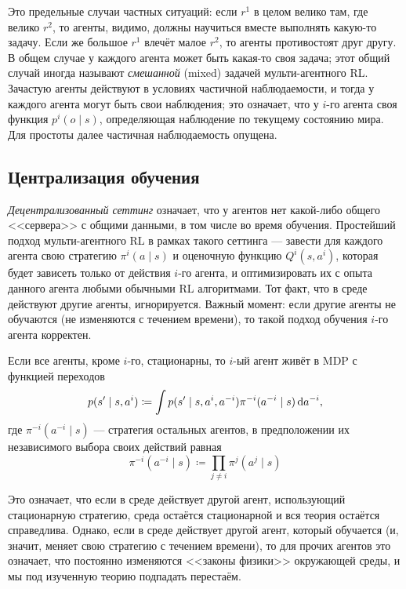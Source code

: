 Это предельные случаи частных ситуаций: если $r^1$ в целом велико там, где велико $r^2$, то агенты, видимо, должны научиться вместе выполнять какую-то задачу. Если же большое $r^1$ влечёт малое $r^2$, то агенты противостоят друг другу. В общем случае у каждого агента может быть какая-то своя задача; этот общий случай иногда называют \emph{смешанной} (mixed) задачей мульти-агентного RL. Зачастую агенты действуют в условиях частичной наблюдаемости, и тогда у каждого агента могут быть свои наблюдения; это означает, что у $i$-го агента своя функция $p^i(o \mid s)$, определяющая наблюдение по текущему состоянию мира. Для простоты далее частичная наблюдаемость опущена. 

\subsection{Централизация обучения}

\emph{Децентрализованный сеттинг} означает, что у агентов нет какой-либо общего <<сервера>> с общими данными, в том числе во время обучения. Простейший подход мульти-агентного RL в рамках такого сеттинга --- завести для каждого агента свою стратегию $\pi^i(a \mid s)$ и оценочную функцию $Q^i(s, a^i)$, которая будет зависеть только от действия $i$-го агента, и оптимизировать их с опыта данного агента любыми обычными RL алгоритмами. Тот факт, что в среде действуют другие агенты, игнорируется. Важный момент: если другие агенты не обучаются (не изменяются с течением времени), то такой подход обучения $i$-го агента корректен.

\begin{proposition}
Если все агенты, кроме $i$-го, стационарны, то $i$-ый агент живёт в MDP с функцией переходов
$$p(s' \mid s, a^i) \coloneqq \int p(s' \mid s, a^i, a^{-i})\pi^{-i}(a^{-i} \mid s) \mathop{}\!\mathrm{d} a^{-i},$$
где $\pi^{-i}(a^{-i} \mid s)$ --- стратегия остальных агентов, в предположении их независимого выбора своих действий равная
$$\pi^{-i}(a^{-i} \mid s) \coloneqq \prod_{j \ne i} \pi^j(a^j \mid s)$$
\end{proposition}

Это означает, что если в среде действует другой агент, использующий стационарную стратегию, среда остаётся стационарной и вся теория остаётся справедлива. Однако, если в среде действует другой агент, который обучается (и, значит, меняет свою стратегию с течением времени), то для прочих агентов это означает, что постоянно изменяются <<законы физики>> окружающей среды, и мы под изученную теорию подпадать перестаём. 

